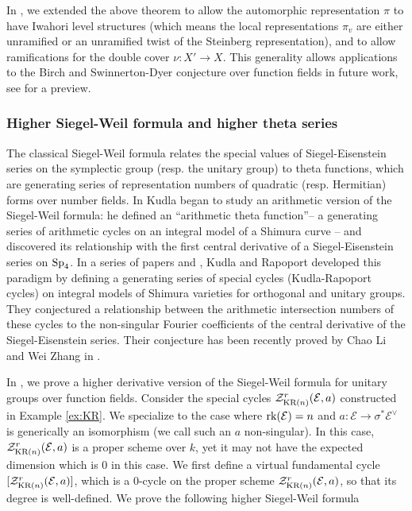 \documentclass[11pt]{amsart}
\numberwithin{equation}{section}
\theoremstyle{plain}
\theoremstyle{definition}
\newcommand\cE{\mathcal{E}}
\newcommand\cZ{\mathcal{Z}}
\newcommand\rk{\textup{rk}}
\newcommand\Sp{\textup{Sp}}
\newcommand\sss{\subsubsection}
\newcommand{\s}{\sigma}
\newcommand\KR{\textup{KR}}
\begin{document}
In \cite{YZ2},  we extended the above theorem to allow the automorphic representation $\pi$ to have Iwahori level structures (which means the local representations $\pi_{v}$ are either unramified or an unramified twist of the Steinberg representation),  and to allow ramifications for the double cover $\nu:X'\to X$. This generality allows applications to the Birch and Swinnerton-Dyer conjecture over function fields in future work, see \cite[\S1.3]{YZ2} for a preview.



\sss{Higher Siegel-Weil formula and higher theta series}
The classical Siegel-Weil formula relates the special values of Siegel-Eisenstein series on the symplectic group (resp. the unitary group) to theta functions, which are generating series of representation numbers of quadratic (resp. Hermitian) forms over number fields.  In \cite{Kud} Kudla began to study an arithmetic version of the Siegel-Weil formula:  he defined an ``arithmetic theta function''-- a generating series of arithmetic cycles on an integral model of a Shimura curve -- and discovered its relationship with the first central derivative of a Siegel-Eisenstein series on $\Sp_{4}$.  In a series of papers \cite{KR1} and \cite{KR2}, Kudla and Rapoport developed this paradigm by defining a generating series of special cycles (Kudla-Rapoport cycles) on integral models of Shimura varieties for orthogonal and unitary groups. They conjectured a relationship between the arithmetic intersection numbers of these cycles to the non-singular Fourier coefficients of the central derivative of the Siegel-Eisenstein series. Their conjecture has been recently proved by Chao Li and Wei Zhang in \cite{LZ}.


In \cite{FYZ1}, we prove a higher derivative version of the Siegel-Weil formula for unitary groups over function fields. Consider the special cycles $\cZ^{r}_{\KR(n)}(\cE,a)$ constructed in Example \ref{ex:KR}. We specialize to the case where $\rk (\cE)=n$ and $a: \cE\to\s^{*}\cE^{\vee}$ is generically an isomorphism (we call such an $a$ non-singular). In this case, $\cZ^{r}_{\KR(n)}(\cE,a)$ is a proper scheme over $k$, yet it may not have the expected dimension which is $0$ in this case. We first define a virtual fundamental cycle $[\cZ^{r}_{\KR(n)}(\cE,a)]$, which is a $0$-cycle on the proper scheme $\cZ^{r}_{\KR(n)}(\cE,a)$, so that its degree is well-defined. We prove the following higher Siegel-Weil formula
\end{document}
